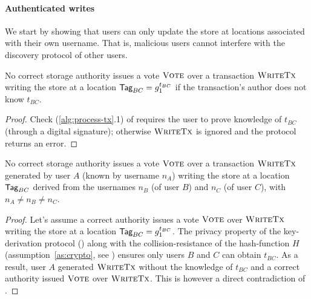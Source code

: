 \paragraph{Authenticated writes}
We start by showing that users can only update the \sysname store at locations associated with their own username. That is, malicious users cannot interfere with the discovery protocol of other users.

\begin{lemma} \label{th:autenticated-tx-processing}
    No correct storage authority issues a vote $\textsc{Vote}$ over a transaction $\textsc{WriteTx}$ writing the \sysname store at a location $\textsf{Tag}_{BC}=g_1^{t_{BC}}$ if the transaction's author does not know $t_{BC}$.
\end{lemma}
\begin{proof}
    Check (\ref{alg:process-tx}.1) of  requires the user to prove knowledge of $t_{BC}$ (through a digital signature); otherwise $\textsc{WriteTx}$ is ignored and the protocol returns an error.
\end{proof}

\begin{lemma} \label{th:authenticated-vote-generation}
    No correct storage authority issues a vote $\textsc{Vote}$ over a transaction $\textsc{WriteTx}$ generated by user $A$ (known by username $n_A$) writing the \sysname store at a location $\textsf{Tag}_{BC}$ derived from the usernames $n_B$ (of user $B$) and $n_C$ (of user $C$), with $n_A \neq n_B \neq n_C$.
\end{lemma}
\begin{proof}
    Let's assume a correct authority issues a vote $\textsc{Vote}$ over $\textsc{WriteTx}$ writing the \sysname store at a location $\textsf{Tag}_{BC}=g_1^{t_{BC}}$.
    The privacy property of the \sysname key-derivation protocol () along with the collision-resistance of the hash-function $H$ (assumption~\ref{as:crypto}, see ) ensures only users $B$ and $C$ can obtain $t_{BC}$.
    As a result, user $A$ generated $\textsc{WriteTx}$ without the knowledge of $t_{BC}$ and a correct authority issued $\textsc{Vote}$ over $\textsc{WriteTx}$. This is however a direct contradiction of .
\end{proof}

